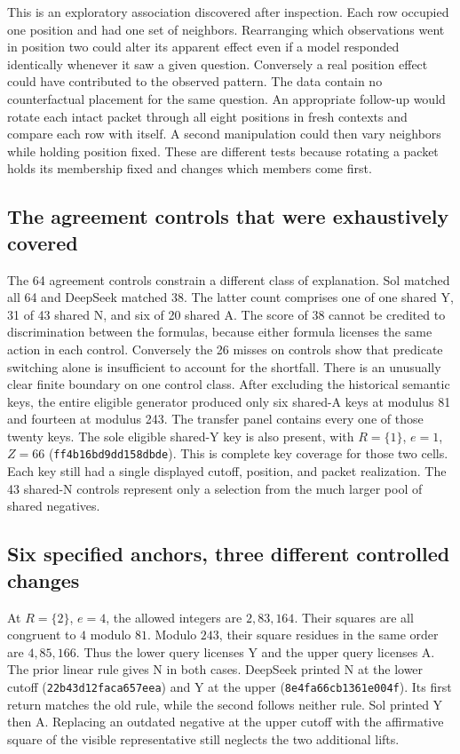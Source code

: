 \documentclass[12pt,letterpaper]{article}
\begin{document}
This is an exploratory association discovered after inspection. Each row occupied one position and had one set of neighbors. Rearranging which observations went in position two could alter its apparent effect even if a model responded identically whenever it saw a given question. Conversely a real position effect could have contributed to the observed pattern. The data contain no counterfactual placement for the same question. An appropriate follow-up would rotate each intact packet through all eight positions in fresh contexts and compare each row with itself. A second manipulation could then vary neighbors while holding position fixed. These are different tests because rotating a packet holds its membership fixed and changes which members come first.

\subsection{The agreement controls that were exhaustively covered}
The 64 agreement controls constrain a different class of explanation. Sol matched all 64 and DeepSeek matched 38. The latter count comprises one of one shared Y, 31 of 43 shared N, and six of 20 shared A. The score of 38 cannot be credited to discrimination between the formulas, because either formula licenses the same action in each control. Conversely the 26 misses on controls show that predicate switching alone is insufficient to account for the shortfall. There is an unusually clear finite boundary on one control class. After excluding the historical semantic keys, the entire eligible generator produced only six shared-A keys at modulus 81 and fourteen at modulus 243. The transfer panel contains every one of those twenty keys. The sole eligible shared-Y key is also present, with $R=\{1\}$, $e=1$, $Z=66$ (\texttt{ff4b16bd9dd158dbde}). This is complete key coverage for those two cells. Each key still had a single displayed cutoff, position, and packet realization. The 43 shared-N controls represent only a selection from the much larger pool of shared negatives.

\subsection{Six specified anchors, three different controlled changes}

At $R=\{2\}$, $e=4$, the allowed integers are $2,83,164$. Their squares are all congruent to $4$ modulo $81$. Modulo $243$, their square residues in the same order are $4,85,166$. Thus the lower query licenses Y and the upper query licenses A. The prior linear rule gives N in both cases. DeepSeek printed N at the lower cutoff (\texttt{22b43d12faca657eea}) and Y at the upper (\texttt{8e4fa66cb1361e004f}). Its first return matches the old rule, while the second follows neither rule. Sol printed Y then A. Replacing an outdated negative at the upper cutoff with the affirmative square of the visible representative still neglects the two additional lifts.
\end{document}
